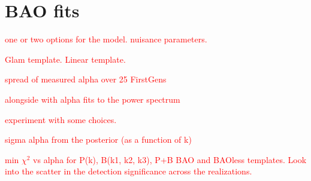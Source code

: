\section{BAO fits}
\label{sec:fits}

\textcolor{red}{one or two options for the model. nuisance parameters.}

\textcolor{red}{Glam template. Linear template.}

\textcolor{red}{spread of measured alpha over 25 FirstGens}

\textcolor{red}{alongside with alpha fits to the power spectrum}

\textcolor{red}{experiment with some choices.}

\textcolor{red}{sigma alpha from the posterior (as a function of k)}

\textcolor{red}{min $\chi^{2}$ vs alpha for P(k), B(k1, k2, k3), P+B BAO and BAOless templates. Look into the scatter in the detection significance across the realizations.}


